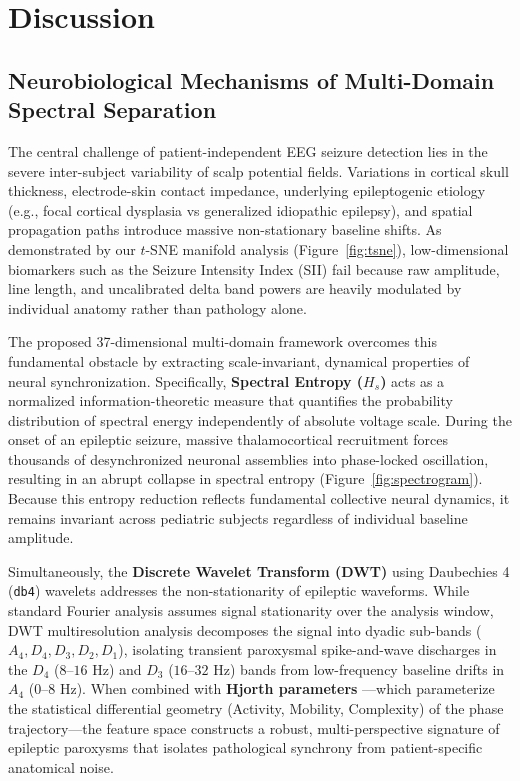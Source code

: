 \documentclass[pdflatex,sn-mathphys-num]{sn-jnl}
\begin{document}
\section{Discussion}\label{sec:discussion}

\subsection{Neurobiological Mechanisms of Multi-Domain Spectral Separation}
The central challenge of patient-independent EEG seizure detection lies in the severe inter-subject variability of scalp potential fields. Variations in cortical skull thickness, electrode-skin contact impedance, underlying epileptogenic etiology (e.g., focal cortical dysplasia vs generalized idiopathic epilepsy), and spatial propagation paths introduce massive non-stationary baseline shifts. As demonstrated by our $t$-SNE manifold analysis (Figure~\ref{fig:tsne}), low-dimensional biomarkers such as the Seizure Intensity Index (SII) fail because raw amplitude, line length, and uncalibrated delta band powers are heavily modulated by individual anatomy rather than pathology alone.

The proposed 37-dimensional multi-domain framework overcomes this fundamental obstacle by extracting scale-invariant, dynamical properties of neural synchronization. Specifically, \textbf{Spectral Entropy ($H_s$)} \cite{shannon1948mathematical,inouye1991potential} acts as a normalized information-theoretic measure that quantifies the probability distribution of spectral energy independently of absolute voltage scale. During the onset of an epileptic seizure, massive thalamocortical recruitment forces thousands of desynchronized neuronal assemblies into phase-locked oscillation, resulting in an abrupt collapse in spectral entropy (Figure~\ref{fig:spectrogram}). Because this entropy reduction reflects fundamental collective neural dynamics, it remains invariant across pediatric subjects regardless of individual baseline amplitude.

Simultaneously, the \textbf{Discrete Wavelet Transform (DWT)} using Daubechies 4 (\texttt{db4}) wavelets \cite{daubechies1992ten,mallat1989theory,sharma2024time} addresses the non-stationarity of epileptic waveforms. While standard Fourier analysis assumes signal stationarity over the analysis window, DWT multiresolution analysis decomposes the signal into dyadic sub-bands ($A_4, D_4, D_3, D_2, D_1$), isolating transient paroxysmal spike-and-wave discharges in the $D_4$ ($8\text{--}16\text{ Hz}$) and $D_3$ ($16\text{--}32\text{ Hz}$) bands from low-frequency baseline drifts in $A_4$ ($0\text{--}8\text{ Hz}$). When combined with \textbf{Hjorth parameters} \cite{hjorth1970eeg,kumar2024hjorth}---which parameterize the statistical differential geometry (Activity, Mobility, Complexity) of the phase trajectory---the feature space constructs a robust, multi-perspective signature of epileptic paroxysms that isolates pathological synchrony from patient-specific anatomical noise.
\end{document}
